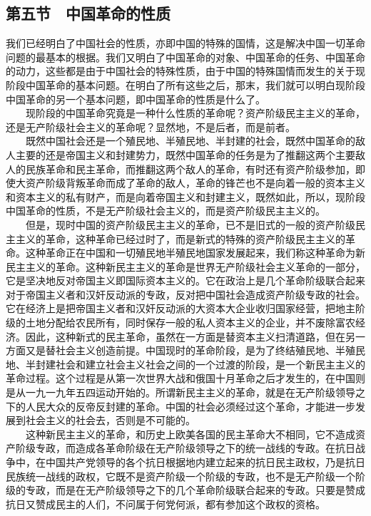 \documentclass[cn,11pt,chinese]{elegantbook}
\def\myformat#1{\hfil\hfil #1}
\begin{document}
\subsection*{\myformat{第五节　中国革命的性质}}
我们已经明白了中国社会的性质，亦即中国的特殊的国情，这是解决中国一切革命问题的最基本的根据。我们又明白了中国革命的对象、中国革命的任务、中国革命的动力，这些都是由于中国社会的特殊性质，由于中国的特殊国情而发生的关于现阶段中国革命的基本问题。在明白了所有这些之后，那末，我们就可以明白现阶段中国革命的另一个基本问题，即中国革命的性质是什么了。\\
　　现阶段的中国革命究竟是一种什么性质的革命呢？资产阶级民主主义的革命，还是无产阶级社会主义的革命呢？显然地，不是后者，而是前者。\\
　　既然中国社会还是一个殖民地、半殖民地、半封建的社会，既然中国革命的敌人主要的还是帝国主义和封建势力，既然中国革命的任务是为了推翻这两个主要敌人的民族革命和民主革命，而推翻这两个敌人的革命，有时还有资产阶级参加，即使大资产阶级背叛革命而成了革命的敌人，革命的锋芒也不是向着一般的资本主义和资本主义的私有财产，而是向着帝国主义和封建主义，既然如此，所以，现阶段中国革命的性质，不是无产阶级社会主义的，而是资产阶级民主主义的。\\
　　但是，现时中国的资产阶级民主主义的革命，已不是旧式的一般的资产阶级民主主义的革命，这种革命已经过时了，而是新式的特殊的资产阶级民主主义的革命。这种革命正在中国和一切殖民地半殖民地国家发展起来，我们称这种革命为新民主主义的革命。这种新民主主义的革命是世界无产阶级社会主义革命的一部分，它是坚决地反对帝国主义即国际资本主义的。它在政治上是几个革命阶级联合起来对于帝国主义者和汉奸反动派的专政，反对把中国社会造成资产阶级专政的社会。它在经济上是把帝国主义者和汉奸反动派的大资本大企业收归国家经营，把地主阶级的土地分配给农民所有，同时保存一般的私人资本主义的企业，并不废除富农经济。因此，这种新式的民主革命，虽然在一方面是替资本主义扫清道路，但在另一方面又是替社会主义创造前提。中国现时的革命阶段，是为了终结殖民地、半殖民地、半封建社会和建立社会主义社会之间的一个过渡的阶段，是一个新民主主义的革命过程。这个过程是从第一次世界大战和俄国十月革命之后才发生的，在中国则是从一九一九年五四运动开始的。所谓新民主主义的革命，就是在无产阶级领导之下的人民大众的反帝反封建的革命。中国的社会必须经过这个革命，才能进一步发展到社会主义的社会去，否则是不可能的。\\
　　这种新民主主义的革命，和历史上欧美各国的民主革命大不相同，它不造成资产阶级专政，而造成各革命阶级在无产阶级领导之下的统一战线的专政。在抗日战争中，在中国共产党领导的各个抗日根据地内建立起来的抗日民主政权，乃是抗日民族统一战线的政权，它既不是资产阶级一个阶级的专政，也不是无产阶级一个阶级的专政，而是在无产阶级领导之下的几个革命阶级联合起来的专政。只要是赞成抗日又赞成民主的人们，不问属于何党何派，都有参加这个政权的资格。\\
\end{document}

